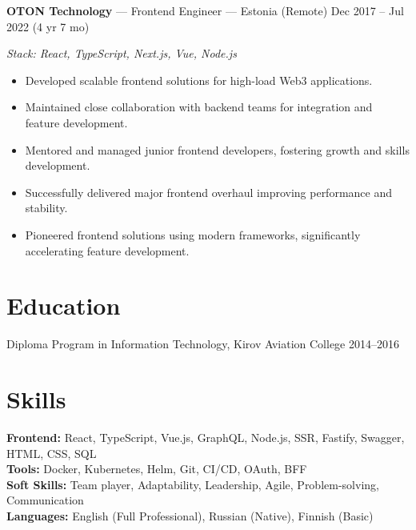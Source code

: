 \documentclass[a4paper,9pt]{article}
\begin{document}
\textbf{OTON Technology} --- Frontend Engineer --- Estonia (Remote) \hfill Dec 2017 -- Jul 2022 (4 yr 7 mo)

\textit{Stack: React, TypeScript, Next.js, Vue, Node.js}
\begin{itemize}[leftmargin=*]
  \item Developed scalable frontend solutions for high-load Web3 applications.
  \item Maintained close collaboration with backend teams for integration and feature development.
  \item Mentored and managed junior frontend developers, fostering growth and skills development.
  \item Successfully delivered major frontend overhaul improving performance and stability.
  \item Pioneered frontend solutions using modern frameworks, significantly accelerating feature development.
\end{itemize}

\section{Education}
Diploma Program in Information Technology, Kirov Aviation College \hfill 2014--2016

\section{Skills}
\textbf{Frontend:} React, TypeScript, Vue.js, GraphQL, Node.js, SSR, Fastify, Swagger, HTML, CSS, SQL\\
\textbf{Tools:} Docker, Kubernetes, Helm, Git, CI/CD, OAuth, BFF\\
\textbf{Soft Skills:} Team player, Adaptability, Leadership, Agile, Problem-solving, Communication\\
\textbf{Languages:} English (Full Professional), Russian (Native), Finnish (Basic)
\end{document}
